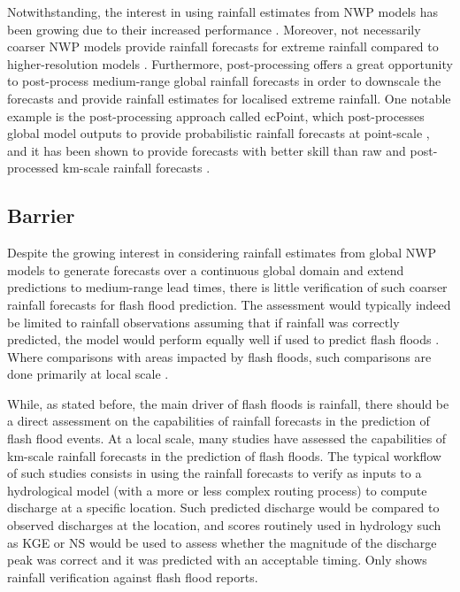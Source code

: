 Notwithstanding, the interest in using rainfall estimates from NWP models has been growing due to their increased performance \citep{Bucherie_2022b}. Moreover, not necessarily coarser NWP models provide rainfall forecasts for extreme rainfall compared to higher-resolution models \citep{Hewson_2024, Wedi_2020}. Furthermore, post-processing offers a great opportunity to post-process medium-range global rainfall forecasts in order to downscale the forecasts and provide rainfall estimates for localised extreme rainfall. One notable example is the post-processing approach called ecPoint, which post-processes global model outputs to provide probabilistic rainfall forecasts at point-scale \citep{Hewson_2021}, and it has been shown to provide forecasts with better skill than raw and post-processed km-scale rainfall forecasts \citep{Gascon_2024}. 

\subsection{Barrier}
Despite the growing interest in considering rainfall estimates from global NWP models to generate forecasts over a continuous global domain and extend predictions to medium-range lead times, there is little verification of such coarser rainfall forecasts for flash flood prediction. The assessment would typically indeed be limited to rainfall observations assuming that if rainfall was correctly predicted, the model would perform equally well if used to predict flash floods \citep{Gascon_2024}. Where comparisons with areas impacted by flash floods, such comparisons are done primarily at local scale \citep{Tripathy_2020}.

While, as stated before, the main driver of flash floods is rainfall, there should be a direct assessment on the capabilities of rainfall forecasts in the prediction of flash flood events. At a local scale, many studies have assessed the capabilities of km-scale rainfall forecasts in the prediction of flash floods. The typical workflow of such studies consists in using the rainfall forecasts to verify as inputs to a hydrological model (with a more or less complex routing process) to compute discharge at a specific location. Such predicted discharge would be compared to observed discharges at the location, and scores routinely used in hydrology such as KGE or NS would be used to assess whether the magnitude of the discharge peak was correct and it was predicted with an acceptable timing. Only \citet{Herman_2018} shows rainfall verification against flash flood reports.  

